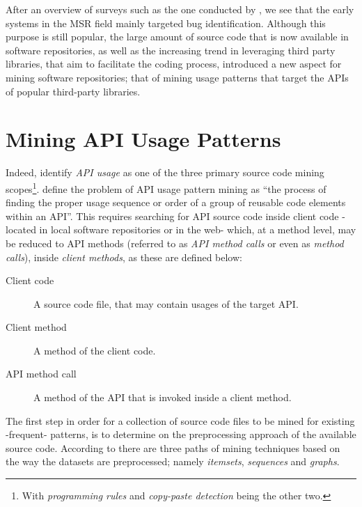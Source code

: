 After an overview of surveys such as the one conducted by , we see that the early systems in the MSR field mainly targeted bug identification. Although this purpose is still popular, the large amount of source code that is now available in software repositories, as well as the increasing trend in leveraging third party libraries, that aim to facilitate the coding process, introduced a new aspect for mining software repositories; that of mining usage patterns that target the APIs of popular third-party libraries.


\section{Mining API Usage Patterns}
\label{sec:api-usage}


Indeed,  \cite{Khatoon:2011} identify \textit{API usage} as one of the three primary source code mining scopes\footnote{With \textit{programming rules} and \textit{copy-paste detection} being the other two.}.  \cite{Ishag:2016} define the problem of API usage pattern mining as ``the process of finding the proper usage sequence or order of a group of reusable code elements within an API''. This requires searching for API source code inside client code -located in local software repositories or in the web- which, at a method level, may be reduced to API methods (referred to as \textit{API method calls} or even as \textit{method calls}), inside \textit{client methods}, as these are defined below:

\begin{description}
\item[Client code] A source code file, that may contain usages of the target API.
\item[Client method] A method of the client code.
\item[API method call] A method of the API that is invoked inside a client method.
\end{description}

The first step in order for a collection of source code files to be mined for existing -frequent- patterns, is to determine on the preprocessing approach of the available source code. According to  \cite{Ishag:2016} there are three paths of mining techniques based on the way the datasets are preprocessed; namely \textit{itemsets}, \textit{sequences} and \textit{graphs}.

